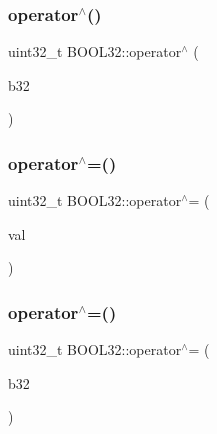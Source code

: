 \hypertarget{struct_b_o_o_l32_ad64db9cff2ce76b97c43fc48c0c3ba30}{}\label{struct_b_o_o_l32_ad64db9cff2ce76b97c43fc48c0c3ba30} 
\subsubsection{\texorpdfstring{operator$^\wedge$()}{operator^()}\hspace{0.1cm}{\footnotesize\ttfamily [2/2]}}
{\footnotesize\ttfamily uint32\+\_\+t B\+O\+O\+L32\+::operator$^\wedge$ (\begin{DoxyParamCaption}\item[{const \hyperlink{struct_b_o_o_l32}{B\+O\+O\+L32}}]{b32 }\end{DoxyParamCaption})\hspace{0.3cm}{\ttfamily [inline]}}

\hypertarget{struct_b_o_o_l32_a4de37092f7ce5ef18af42463178ff1ad}{}\label{struct_b_o_o_l32_a4de37092f7ce5ef18af42463178ff1ad} 
\subsubsection{\texorpdfstring{operator$^\wedge$=()}{operator^=()}\hspace{0.1cm}{\footnotesize\ttfamily [1/2]}}
{\footnotesize\ttfamily uint32\+\_\+t B\+O\+O\+L32\+::operator$^\wedge$= (\begin{DoxyParamCaption}\item[{const uint32\+\_\+t}]{val }\end{DoxyParamCaption})\hspace{0.3cm}{\ttfamily [inline]}}

\hypertarget{struct_b_o_o_l32_a66f1d7ff5bdb09a1e3eeae9fcca517f1}{}\label{struct_b_o_o_l32_a66f1d7ff5bdb09a1e3eeae9fcca517f1} 
\subsubsection{\texorpdfstring{operator$^\wedge$=()}{operator^=()}\hspace{0.1cm}{\footnotesize\ttfamily [2/2]}}
{\footnotesize\ttfamily uint32\+\_\+t B\+O\+O\+L32\+::operator$^\wedge$= (\begin{DoxyParamCaption}\item[{const \hyperlink{struct_b_o_o_l32}{B\+O\+O\+L32}}]{b32 }\end{DoxyParamCaption})\hspace{0.3cm}{\ttfamily [inline]}}

